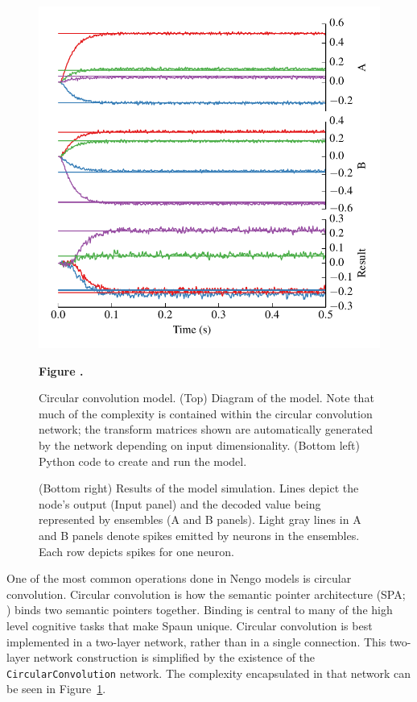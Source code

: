 \documentclass{frontiersSCNS}
\begin{document}
\begin{figure}
\begin{center}
\begin{minipage}{0.43\textwidth}
    \includegraphics[width=\textwidth]{cconv_res}
  \end{minipage}
\end{center}
 \textbf{\label{fig:cconv} Figure .}{
   Circular convolution model. (Top) Diagram of the model.
   Note that much of the complexity is contained within the
   circular convolution network; the transform matrices shown
   are automatically generated by the network depending on
   input dimensionality.
   (Bottom left) Python code to create and run the model.

   (Bottom right) Results of the model simulation. Lines depict
   the node's output (Input panel) and the decoded value being represented
   by ensembles (A and B panels). Light gray lines in A and B panels denote
   spikes emitted by neurons in the ensembles. Each row depicts spikes
   for one neuron.}
\end{figure}

One of the most common operations done
in Nengo models is circular convolution.
Circular convolution is how
the semantic pointer architecture
(SPA; \cite{TODO})
binds two semantic pointers together.
Binding is central to many
of the high level cognitive tasks
that make Spaun unique.
Circular convolution
is best implemented in a two-layer network,
rather than in a single connection.
This two-layer network construction is simplified
by the existence of the \texttt{CircularConvolution} network.
The complexity encapsulated in that network
can be seen in Figure~\ref{fig:cconv}.
\end{document}
